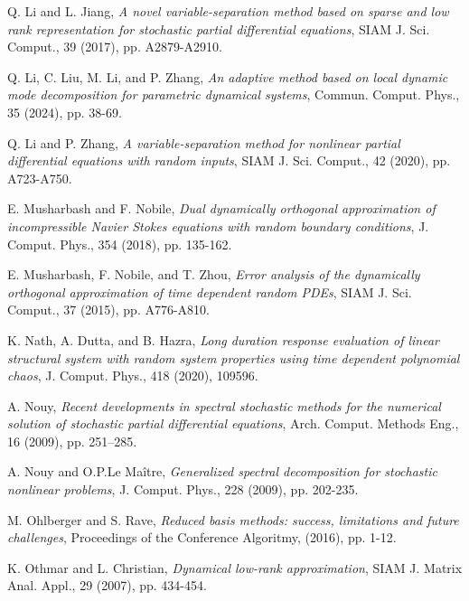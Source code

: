 \documentclass[10pt,a4paper]{article}
\numberwithin{equation}{section}
\numberwithin{lemma}{section}
\numberwithin{example}{section}
\numberwithin{definition}{section}
\numberwithin{assumption}{section}
\numberwithin{theorem}{section}
\numberwithin{proposition}{section}
\numberwithin{corollary}{section}
\numberwithin{remark}{section}
\begin{document}
\begin{thebibliography}{}
    {\sc Q. Li and L. Jiang}, {\em A novel variable-separation method based on sparse and low rank representation for stochastic partial differential equations}, SIAM J. Sci. Comput., 39 (2017), pp. A2879-A2910.

    {\sc Q. Li, C. Liu, M. Li, and P. Zhang}, {\em An adaptive method based on local dynamic mode decomposition for parametric dynamical systems}, Commun. Comput. Phys., 35 (2024), pp. 38-69.
    
    {\sc Q. Li and P. Zhang}, {\em A variable-separation method for nonlinear partial differential equations with random inputs}, SIAM J. Sci. Comput., 42 (2020), pp. A723-A750.

     
    
    {\sc E. Musharbash and F. Nobile}, {\em Dual dynamically orthogonal approximation of incompressible Navier Stokes equations with random boundary conditions}, J. Comput. Phys., 354 (2018), pp. 135-162.

    {\sc E. Musharbash, F. Nobile, and T. Zhou}, {\em Error analysis of the dynamically orthogonal approximation of time dependent random PDEs}, SIAM J. Sci. Comput., 37 (2015), pp. A776-A810.
    
    {\sc K. Nath, A. Dutta, and B. Hazra}, {\em Long duration response evaluation of linear structural system with random system properties using time dependent polynomial chaos}, J. Comput. Phys., 418 (2020), 109596.

    {\sc A. Nouy}, {\em Recent developments in spectral stochastic methods for the numerical solution of stochastic partial differential equations}, Arch. Comput. Methods Eng., 16 (2009), pp. 251–285.

    {\sc A. Nouy and O.P.Le Ma{\^i}tre}, {\em Generalized spectral decomposition for stochastic nonlinear problems}, J. Comput. Phys., 228 (2009), pp. 202-235.
    
    {\sc M. Ohlberger and S. Rave}, {\em Reduced basis methods: success, limitations and future challenges}, Proceedings of the Conference Algoritmy, (2016), pp. 1-12.
  
    {\sc K. Othmar and L. Christian}, {\em Dynamical low-rank approximation}, SIAM J. Matrix Anal. Appl., 29 (2007), pp. 434-454.



\end{thebibliography}
\end{document}
